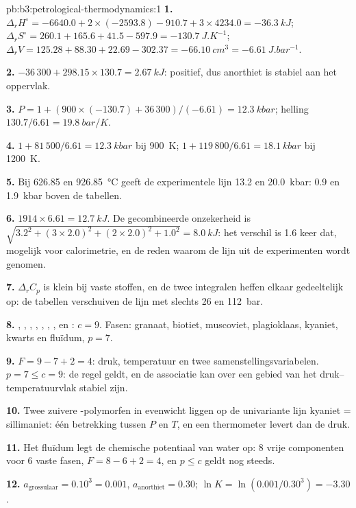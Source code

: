 \begin{solution}{pb:b3:petrological-thermodynamics:1}
\textbf{1.} $\Delta_rH^\circ = -6640.0 + 2\times(-2593.8) - 910.7 + 3\times4234.0
= \qty{-36.3}{kJ}$; $\Delta_rS^\circ = 260.1 + 165.6 + 41.5 - 597.9 =
\qty{-130.7}{J.K^{-1}}$; $\Delta_rV = 125.28 + 88.30 + 22.69 - 302.37 =
\qty{-66.10}{cm^3} = \qty{-6.61}{J.bar^{-1}}$.

\textbf{2.} $-36\,300 + 298.15\times130.7 = \qty{+2.67}{kJ}$: positief, dus
anorthiet is stabiel aan het oppervlak.

\textbf{3.} $P = 1 + (900\times(-130.7) + 36\,300)/(-6.61) = \qty{12.3}{kbar}$;
helling $130.7/6.61 = \qty{19.8}{bar/K}$.

\textbf{4.} $1 + 81\,500/6.61 = \qty{12.3}{kbar}$ bij \qty{900}{K}; $1 +
119\,800/6.61 = \qty{18.1}{kbar}$ bij \qty{1200}{K}.

\textbf{5.} Bij 626.85 en \qty{926.85}{\celsius} geeft de experimentele lijn
13.2 en \qty{20.0}{kbar}: 0.9 en \qty{1.9}{kbar} boven de tabellen.

{\sloppy\textbf{6.} $1914\times6.61 = \qty{12.7}{kJ}$. De gecombineerde onzekerheid is
$\sqrt{3.2^2 + (3\times2.0)^2 + (2\times2.0)^2 + 1.0^2} = \qty{8.0}{kJ}$: het
verschil is 1.6 keer dat, mogelijk voor calorimetrie, en de reden waarom de lijn
uit de experimenten wordt genomen.\par}

\textbf{7.} $\Delta_rC_p$ is klein bij vaste stoffen, en de twee integralen
heffen elkaar gedeeltelijk op: de tabellen verschuiven de lijn met slechts 26 en \qty{112}{bar}.

\textbf{8.} , , , , , ,
,  en : $c = 9$. Fasen: granaat, biotiet,
muscoviet, plagioklaas, kyaniet, kwarts en fluïdum, $p = 7$.

\textbf{9.} $F = 9 - 7 + 2 = 4$: druk, temperatuur en twee
samenstellingsvariabelen. $p = 7 \le c = 9$: de regel geldt, en de associatie
kan over een gebied van het druk--temperatuurvlak stabiel zijn.

\textbf{10.} Twee zuivere -polymorfen in evenwicht liggen op de
univariante lijn kyaniet = sillimaniet: één betrekking tussen $P$ en $T$, en
een thermometer levert dan de druk.

\textbf{11.} Het fluïdum legt de chemische potentiaal van water op: 8 vrije
componenten voor 6 vaste fasen, $F = 8 - 6 + 2 = 4$, en $p \le c$
geldt nog steeds.

\textbf{12.} $a_{\text{grossulaar}} = 0.10^3 = 0.001$, $a_{\text{anorthiet}} =
0.30$; $\ln K = \ln(0.001/0.30^3) = -3.30$.


\end{solution}
